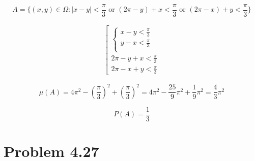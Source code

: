 \documentclass[12pt,letterpaper]{article}
\begin{document}
\[ A = \{ (x, y) \in \Omega : |x-y| < \frac{\pi}{3}
    \text{ or } (2\pi - y) + x < \frac{\pi}{3} 
    \text{ or } (2\pi -x) + y < \frac{\pi}{3} \} \]

    \begin{gather*}
        \left[
        \begin{array}{ll}
            \begin{cases}
                x - y < \frac{\pi}{3} \\
                y - x < \frac{\pi}{3} \\
            \end{cases} \\
            2\pi - y + x < \frac{\pi}{3} \\
            2\pi - x + y < \frac{\pi}{3}
        \end{array}
        \right.
    \end{gather*}

    \[ \mu(A) = 4\pi^2 -
        \left(\frac{\pi}{3}\right)^2
        + \left(\frac{\pi}{3}\right)^2 = 
        4\pi^2 - \frac{25}{9}\pi^2 + \frac{1}{9}\pi^2 =
        \frac{4}{3}\pi^2
    \]

    \[ P(A) = \frac{1}{3} \]


    \section*{Problem 4.27}
\end{document}
